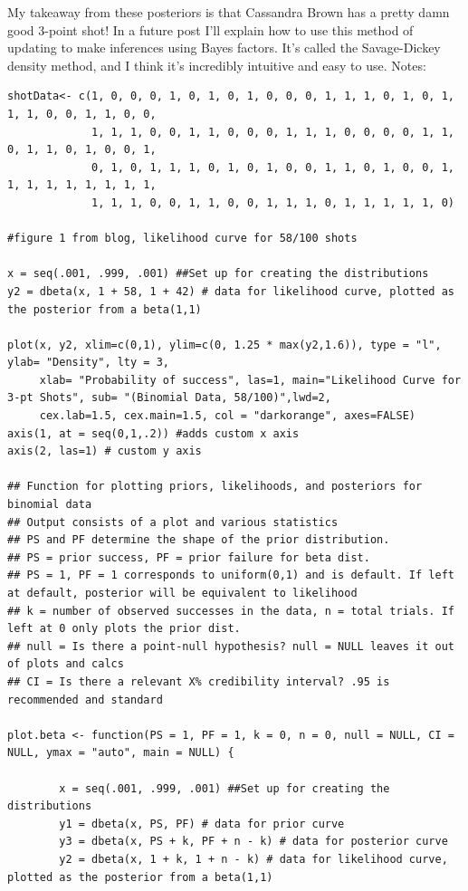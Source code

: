 My takeaway from these posteriors is that Cassandra Brown has a pretty damn good 3-point shot! In a future post I'll explain how to use this method of updating to make inferences using Bayes factors. It's called the Savage-Dickey density method, and I think it's incredibly intuitive and easy to use.
Notes:

\begin{lstlisting}
shotData<- c(1, 0, 0, 0, 1, 0, 1, 0, 1, 0, 0, 0, 1, 1, 1, 0, 1, 0, 1, 1, 1, 0, 0, 1, 1, 0, 0,
             1, 1, 1, 0, 0, 1, 1, 0, 0, 0, 1, 1, 1, 0, 0, 0, 0, 1, 1, 0, 1, 1, 0, 1, 0, 0, 1,
             0, 1, 0, 1, 1, 1, 0, 1, 0, 1, 0, 0, 1, 1, 0, 1, 0, 0, 1, 1, 1, 1, 1, 1, 1, 1, 1,
             1, 1, 1, 0, 0, 1, 1, 0, 0, 1, 1, 1, 0, 1, 1, 1, 1, 1, 0)

#figure 1 from blog, likelihood curve for 58/100 shots

x = seq(.001, .999, .001) ##Set up for creating the distributions
y2 = dbeta(x, 1 + 58, 1 + 42) # data for likelihood curve, plotted as the posterior from a beta(1,1)

plot(x, y2, xlim=c(0,1), ylim=c(0, 1.25 * max(y2,1.6)), type = "l", ylab= "Density", lty = 3,
     xlab= "Probability of success", las=1, main="Likelihood Curve for 3-pt Shots", sub= "(Binomial Data, 58/100)",lwd=2,
     cex.lab=1.5, cex.main=1.5, col = "darkorange", axes=FALSE)
axis(1, at = seq(0,1,.2)) #adds custom x axis
axis(2, las=1) # custom y axis

## Function for plotting priors, likelihoods, and posteriors for binomial data
## Output consists of a plot and various statistics
## PS and PF determine the shape of the prior distribution.
## PS = prior success, PF = prior failure for beta dist. 
## PS = 1, PF = 1 corresponds to uniform(0,1) and is default. If left at default, posterior will be equivalent to likelihood
## k = number of observed successes in the data, n = total trials. If left at 0 only plots the prior dist.
## null = Is there a point-null hypothesis? null = NULL leaves it out of plots and calcs
## CI = Is there a relevant X% credibility interval? .95 is recommended and standard

plot.beta <- function(PS = 1, PF = 1, k = 0, n = 0, null = NULL, CI = NULL, ymax = "auto", main = NULL) {
        
        x = seq(.001, .999, .001) ##Set up for creating the distributions
        y1 = dbeta(x, PS, PF) # data for prior curve
        y3 = dbeta(x, PS + k, PF + n - k) # data for posterior curve
        y2 = dbeta(x, 1 + k, 1 + n - k) # data for likelihood curve, plotted as the posterior from a beta(1,1)
        

\end{lstlisting}
